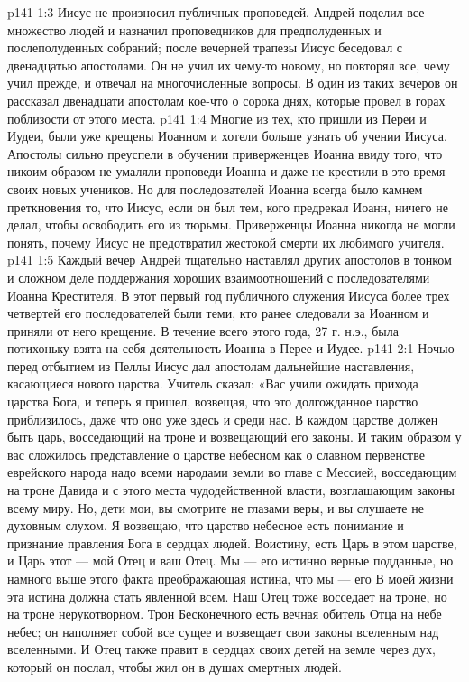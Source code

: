 \vs p141 1:3 Иисус не произносил публичных проповедей. Андрей поделил все множество людей и назначил проповедников для предполуденных и послеполуденных собраний; после вечерней трапезы Иисус беседовал с двенадцатью апостолами. Он не учил их чему\hyp{}то новому, но повторял все, чему учил прежде, и отвечал на многочисленные вопросы. В один из таких вечеров он рассказал двенадцати апостолам кое\hyp{}что о сорока днях, которые провел в горах поблизости от этого места.
\vs p141 1:4 Многие из тех, кто пришли из Переи и Иудеи, были уже крещены Иоанном и хотели больше узнать об учении Иисуса. Апостолы сильно преуспели в обучении приверженцев Иоанна ввиду того, что никоим образом не умаляли проповеди Иоанна и даже не крестили в это время своих новых учеников. Но для последователей Иоанна всегда было камнем преткновения то, что Иисус, если он был тем, кого предрекал Иоанн, ничего не делал, чтобы освободить его из тюрьмы. Приверженцы Иоанна никогда не могли понять, почему Иисус не предотвратил жестокой смерти их любимого учителя.
\vs p141 1:5 Каждый вечер Андрей тщательно наставлял других апостолов в тонком и сложном деле поддержания хороших взаимоотношений с последователями Иоанна Крестителя. В этот первый год публичного служения Иисуса более трех четвертей его последователей были теми, кто ранее следовали за Иоанном и приняли от него крещение. В течение всего этого года, 27 г. н.э., была потихоньку взята на себя деятельность Иоанна в Перее и Иудее.
\vs p141 2:1 Ночью перед отбытием из Пеллы Иисус дал апостолам дальнейшие наставления, касающиеся нового царства. Учитель сказал: «Вас учили ожидать прихода царства Бога, и теперь я пришел, возвещая, что это долгожданное царство приблизилось, даже что оно уже здесь и среди нас. В каждом царстве должен быть царь, восседающий на троне и возвещающий его законы. И таким образом у вас сложилось представление о царстве небесном как о славном первенстве еврейского народа надо всеми народами земли во главе с Мессией, восседающим на троне Давида и с этого места чудодейственной власти, возглашающим законы всему миру. Но, дети мои, вы смотрите не глазами веры, и вы слушаете не духовным слухом. Я возвещаю, что царство небесное есть понимание и признание правления Бога в сердцах людей. Воистину, есть Царь в этом царстве, и Царь этот --- мой Отец и ваш Отец. Мы --- его истинно верные подданные, но намного выше этого факта преображающая истина, что мы --- его  В моей жизни эта истина должна стать явленной всем. Наш Отец тоже восседает на троне, но на троне нерукотворном. Трон Бесконечного есть вечная обитель Отца на небе небес; он наполняет собой все сущее и возвещает свои законы вселенным над вселенными. И Отец также правит в сердцах своих детей на земле через дух, который он послал, чтобы жил он в душах смертных людей.
